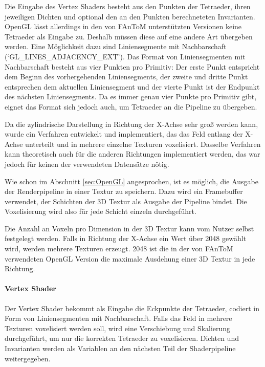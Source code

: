 \documentclass[a4paper,fontsize=12pt,toc=bib,halfparskip]{scrartcl}
\begin{document}
Die Eingabe des Vertex Shaders besteht aus den Punkten der Tetraeder, ihren jeweiligen Dichten und optional den an den Punkten berechneteten Invarianten. OpenGL l\"asst allerdings in den von FAnToM unterst\"utzten Versionen keine Tetraeder als Eingabe zu. Deshalb m\"ussen diese auf eine andere Art \"ubergeben werden. Eine M\"oglichkeit dazu sind Liniensegmente mit Nachbarschaft (`GL\_LINES\_ADJACENCY\_EXT'). Das Format von Liniensegmenten mit Nachbarschaft besteht aus vier Punkten pro Primitiv: Der erste Punkt entspricht dem Beginn des vorhergehenden Liniensegments, der zweite und dritte Punkt entsprechen dem aktuellen Liniensegment und der vierte Punkt ist der Endpunkt des n\"achsten Liniensegments. Da es immer genau vier Punkte pro Primitiv gibt, eignet das Format sich jedoch auch, um Tetraeder an die Pipeline zu \"ubergeben.

Da die zylindrische Darstellung in Richtung der X-Achse sehr gro{\ss} werden kann, wurde ein Verfahren entwickelt und implementiert, das das Feld entlang der X-Achse unterteilt und in mehrere einzelne Texturen voxelisiert. Dasselbe Verfahren kann theoretisch auch f\"ur die anderen Richtungen implementiert werden, das war jedoch f\"ur keinen der verwendeten Datens\"atze n\"otig.

Wie schon im Abschnitt \ref{sec:OpenGL} angesprochen, ist es m\"oglich, die Ausgabe der Renderpipeline in einer Textur zu speichern. Dazu wird ein Framebuffer verwendet, der Schichten der 3D Textur als Ausgabe der Pipeline bindet. Die Voxelisierung wird also f\"ur jede Schicht einzeln durchgef\"uhrt.

Die Anzahl an Voxeln pro Dimension in der 3D Textur kann vom Nutzer selbst festgelegt werden. Falls in Richtung der X-Achse ein Wert \"uber 2048 gew\"ahlt wird, werden mehrere Texturen erzeugt. 2048 ist die in der von FAnToM verwendeten OpenGL Version die maximale Ausdehung einer 3D Textur in jede Richtung.

\paragraph{Vertex Shader}
Der Vertex Shader bekommt als Eingabe die Eckpunkte der Tetraeder, codiert in Form von Liniensegmenten mit Nachbarschaft. Falls das Feld in mehrere Texturen voxelisiert werden soll, wird eine Verschiebung und Skalierung durchgef\"uhrt, um nur die korrekten Tetraeder zu voxelisieren. Dichten und Invarianten werden als Variablen an den n\"achsten Teil der Shaderpipeline weitergegeben.
\end{document}
